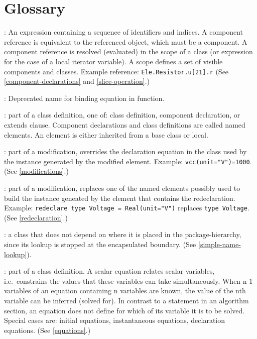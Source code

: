 \chapter{Glossary}\label{glossary}

: An expression containing a sequence of
identifiers and indices. A component reference is equivalent to the
referenced object, which must be a component. A component reference is
resolved (evaluated) in the scope of a class (or expression for the case
of a local iterator variable). A scope defines a set of visible
  components and classes. Example reference: \lstinline!Ele.Resistor.u[21].r! (See
\cref{component-declarations} and \cref{slice-operation}.)

: Deprecated name for binding equation in function.

: part of a class definition, one of: class definition,
component declaration, or extends clause. Component declarations and
class definitions are called named elements. An element is either
inherited from a base class or local.

: part of a modification, overrides the
declaration equation in the class used by the instance generated by the
modified element. Example: \lstinline!vcc(unit="V")=1000!. (See \cref{modifications}.)

: part of a modification, replaces one of
the named elements possibly used to build the instance geneated by the
element that contains the redeclaration. Example: \lstinline!redeclare type Voltage = Real(unit="V")! replaces \lstinline!type Voltage!. (See \cref{redeclaration}.)

: a class that does not depend on where it is
placed in the package-hierarchy, since its lookup is stopped at the
encapsulated boundary. (See \cref{simple-name-lookup}).

: part of a class definition. A scalar equation relates
scalar variables, i.e.\ constrains the values that these variables can
take simultaneously. When n-1 variables of an equation containing n
variables are known, the value of the nth variable can be inferred
(solved for). In contrast to a statement in an algorithm section, an
equation does not define for which of its variable it is to be solved.
Special cases are: initial equations, instantaneous equations,
declaration equations. (See \cref{equations}.)

